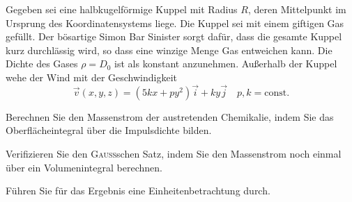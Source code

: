 \begin{atiTask}[
  title = Kuppelkatastrophe
]

Gegeben sei eine halbkugelförmige Kuppel mit Radius $R$, deren Mittelpunkt im Ursprung des Koordinatensystems liege. Die Kuppel sei mit einem giftigen Gas gefüllt. Der bösartige Simon Bar Sinister sorgt dafür, dass die gesamte Kuppel kurz durchlässig wird, so dass eine winzige Menge Gas entweichen kann. Die Dichte des Gases $\rho=D_0$ ist als konstant anzunehmen. Außerhalb der Kuppel wehe der Wind mit der Geschwindigkeit
\[
\vec{v}(x,y,z)=(5kx+py^2)\vec{i} +ky \vec{j}\quad p,k=\text{const}.
\]

\begin{atiSubtasks}
\item Berechnen Sie den Massenstrom der austretenden Chemikalie, indem Sie das Oberflächeintegral über die Impulsdichte bilden.
\item Verifizieren Sie den \textsc{Gauss}schen Satz, indem Sie den Massenstrom noch einmal über ein Volumenintegral berechnen.
\item Führen Sie für das Ergebnis eine Einheitenbetrachtung durch.
\end{atiSubtasks}

\end{atiTask}

\begin{atiSolution}

\end{atiSolution}